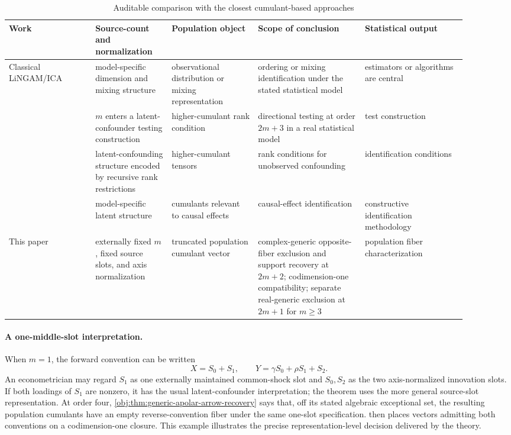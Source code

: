 \begin{table}[ht]
\centering
\scriptsize
\caption{Auditable comparison with the closest cumulant-based approaches}
\begin{tabular}{p{0.17\linewidth}p{0.15\linewidth}p{0.17\linewidth}p{0.21\linewidth}p{0.20\linewidth}}
\hline
Work & Source-count and normalization & Population object & Scope of conclusion & Statistical output \\
\hline
Classical LiNGAM/ICA & model-specific dimension and mixing structure & observational distribution or mixing representation & ordering or mixing identification under the stated statistical model & estimators or algorithms are central \\
\citet{ChenPengHuangEtAl2025Direction} & \(m\) enters a latent-confounder testing construction & higher-cumulant rank condition & directional testing at order \(2m+3\) in a real statistical model & test construction \\
\citet{SchkodaRobevaDrton2024} & latent-confounding structure encoded by recursive rank restrictions & higher-cumulant tensors & rank conditions for unobserved confounding & identification conditions \\
\citet{TramontanoKivvaSalehkaleybarDrtonKiyavash2024,TramontanoKivvaSalehkaleybarDrtonKiyavash2025} & model-specific latent structure & cumulants relevant to causal effects & causal-effect identification & constructive identification methodology \\
This paper & externally fixed \(m\), fixed source slots, and axis normalization & truncated population cumulant vector & complex-generic opposite-fiber exclusion and support recovery at \(2m+2\); codimension-one compatibility; separate real-generic exclusion at \(2m+1\) for \(m\ge3\) & population fiber characterization \\
\hline
\end{tabular}
\end{table}

\paragraph{A one-middle-slot interpretation.}
When \(m=1\), the forward convention can be written
\[
X=S_0+S_1,\qquad
Y=\gamma S_0+\rho S_1+S_2.
\]
An econometrician may regard \(S_1\) as one externally maintained common-shock slot and \(S_0,S_2\) as the two axis-normalized innovation slots. If both loadings of \(S_1\) are nonzero, it has the usual latent-confounder interpretation; the theorem uses the more general source-slot representation. At order four, \cref{obj:thm:generic-apolar-arrow-recovery} says that, off its stated algebraic exceptional set, the resulting population cumulants have an empty reverse-convention fiber under the same one-slot specification.  then places vectors admitting both conventions on a codimension-one closure. This example illustrates the precise representation-level decision delivered by the theory.

